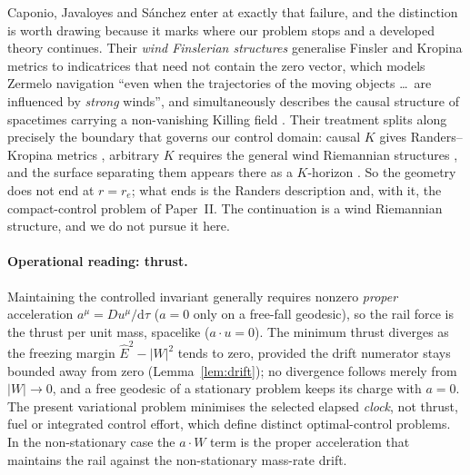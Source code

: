 \documentclass[12pt]{iopart}
\newcommand{\Ehat}{\hat E}
\newcommand{\dd}{\mathrm{d}}
\theoremstyle{plain}
\theoremstyle{definition}
\theoremstyle{plain}
\theoremstyle{remark}
\begin{document}
Caponio, Javaloyes and S\'anchez enter at exactly that failure, and the
distinction is worth drawing because it marks where our problem stops and a
developed theory continues. Their \emph{wind Finslerian structures} generalise
Finsler and Kropina metrics to indicatrices that need not contain the zero vector,
which models Zermelo navigation ``even when the trajectories of the moving objects
\dots\ are influenced by \emph{strong} winds'', and simultaneously describes the
causal structure of spacetimes carrying a non-vanishing Killing field
\cite{CaponioWind}. Their treatment splits along precisely the boundary that
governs our control domain: causal $K$ gives Randers--Kropina metrics
\cite[\S4]{CaponioWind}, arbitrary $K$ requires the general wind Riemannian
structures \cite[\S5]{CaponioWind}, and the surface separating them appears there
as a $K$-horizon \cite[\S8.3]{CaponioWind}. So the geometry does not end at
$r=r_e$; what ends is the Randers description and, with it, the compact-control
problem of Paper~II. The continuation is a wind Riemannian structure, and we do not
pursue it here.

\paragraph{Operational reading: thrust.} Maintaining the controlled invariant generally
requires nonzero \emph{proper} acceleration $a^\mu=Du^\mu/\dd\tau$ ($a=0$ only on a
free-fall geodesic), so the rail force is the thrust per unit mass, spacelike
($a\cdot u=0$). The minimum thrust diverges as the freezing margin $\Ehat^2-|W|^2$
tends to zero, provided the drift numerator stays bounded away from zero
(Lemma~\ref{lem:drift}); no divergence follows merely from $|W|\to0$, and a free geodesic
of a stationary problem keeps its charge with $a=0$. The
present variational problem minimises the selected elapsed \emph{clock}, not thrust, fuel
or integrated control effort, which define distinct optimal-control problems. In the
non-stationary case the $a\cdot W$ term is the proper acceleration that maintains the rail
against the non-stationary mass-rate drift.
\end{document}

